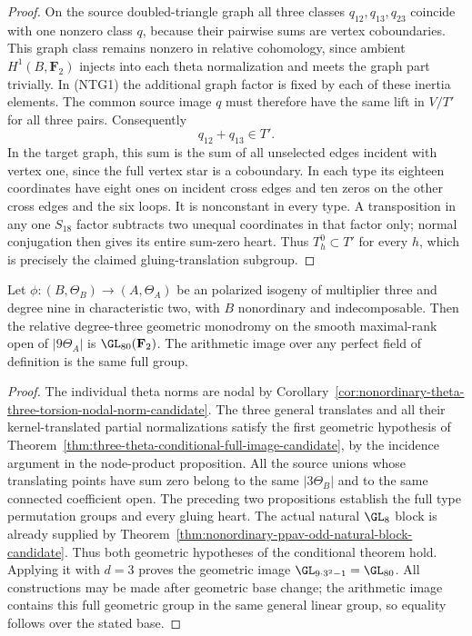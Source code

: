 \begin{proof}
On the source doubled-triangle graph all three classes
$q_{12},q_{13},q_{23}$ coincide with one nonzero class $q$,
because their pairwise sums are vertex coboundaries. This
graph class remains nonzero in relative cohomology, since
ambient $H^1(B,\mathbf F_2)$ injects into each theta
normalization and meets the graph part trivially.
In (NTG1) the additional graph factor is fixed by each of
these inertia elements. The common source image $q$ must
therefore have the same lift in $V/T'$ for all three pairs.
Consequently
\[
                              q_{12}+q_{13}\in T'.       \tag{NTG2}
\]
In the target graph, this sum is the sum of all unselected
edges incident with vertex one, since the full vertex star
is a coboundary. In each type its eighteen coordinates have
eight ones on incident cross edges and ten zeros on the
other cross edges and the six loops. It is nonconstant in
every type. A transposition in any one $S_{18}$ factor
subtracts two unequal coordinates in that factor only;
normal conjugation then gives its entire sum-zero heart.
Thus $T_h^0\subset T'$ for every $h$, which is precisely
the claimed gluing-translation subgroup.
\end{proof}

\begin{theorem}
\label{thm:nonordinary-degree-three-from-neighbour-candidate}
Let $\phi:(B,\Theta_B)\to(A,\Theta_A)$ be an \etale polarized
isogeny of multiplier three and degree nine in characteristic two,
with $B$ nonordinary and indecomposable. Then the relative
degree-three geometric monodromy on the smooth maximal-rank
open of $|9\Theta_A|$ is $\GL_{80}(\mathbf F_2)$.
The arithmetic image over any perfect field of definition is
the same full group.
\end{theorem}
\begin{proof}
The individual theta norms are nodal by
Corollary~\ref{cor:nonordinary-theta-three-torsion-nodal-norm-candidate}.
The three general translates and all their kernel-translated
partial normalizations satisfy the first geometric hypothesis
of Theorem~\ref{thm:three-theta-conditional-full-image-candidate},
by the incidence argument in the node-product proposition.
All the source unions whose translating points have sum zero
belong to the same $|3\Theta_B|$ and to the same connected
coefficient open. The preceding two propositions establish
the full type permutation groups and every gluing heart.
The actual natural $\GL_8$ block is already supplied by
Theorem~\ref{thm:nonordinary-ppav-odd-natural-block-candidate}.
Thus both geometric hypotheses of the conditional theorem
hold. Applying it with $d=3$ proves the geometric image
$\GL_{9\cdot3^2-1}=\GL_{80}$. All constructions may be
made after geometric base change; the arithmetic image
contains this full geometric group in the same general
linear group, so equality follows over the stated base.
\end{proof}

